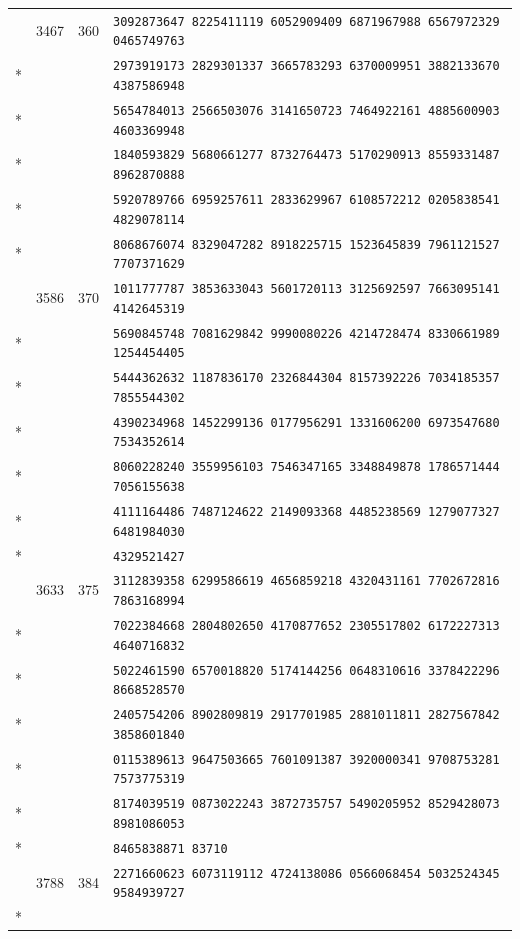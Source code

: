 \documentclass[10pt]{article}
\begin{document}
\begin{longtable}{@{}r@{\quad}r@{\quad}r@{\quad}l@{}}
\addlinespace[2pt]
76 & 3467 & 360 & \texttt{3092873647 8225411119 6052909409 6871967988 6567972329 0465749763}\\*
 & &  & \texttt{2973919173 2829301337 3665783293 6370009951 3882133670 4387586948}\\*
 & &  & \texttt{5654784013 2566503076 3141650723 7464922161 4885600903 4603369948}\\*
 & &  & \texttt{1840593829 5680661277 8732764473 5170290913 8559331487 8962870888}\\*
 & &  & \texttt{5920789766 6959257611 2833629967 6108572212 0205838541 4829078114}\\*
 & &  & \texttt{8068676074 8329047282 8918225715 1523645839 7961121527 7707371629}\\
\addlinespace[2pt]
77 & 3586 & 370 & \texttt{1011777787 3853633043 5601720113 3125692597 7663095141 4142645319}\\*
 & &  & \texttt{5690845748 7081629842 9990080226 4214728474 8330661989 1254454405}\\*
 & &  & \texttt{5444362632 1187836170 2326844304 8157392226 7034185357 7855544302}\\*
 & &  & \texttt{4390234968 1452299136 0177956291 1331606200 6973547680 7534352614}\\*
 & &  & \texttt{8060228240 3559956103 7546347165 3348849878 1786571444 7056155638}\\*
 & &  & \texttt{4111164486 7487124622 2149093368 4485238569 1279077327 6481984030}\\*
 & &  & \texttt{4329521427}\\
\addlinespace[2pt]
78 & 3633 & 375 & \texttt{3112839358 6299586619 4656859218 4320431161 7702672816 7863168994}\\*
 & &  & \texttt{7022384668 2804802650 4170877652 2305517802 6172227313 4640716832}\\*
 & &  & \texttt{5022461590 6570018820 5174144256 0648310616 3378422296 8668528570}\\*
 & &  & \texttt{2405754206 8902809819 2917701985 2881011811 2827567842 3858601840}\\*
 & &  & \texttt{0115389613 9647503665 7601091387 3920000341 9708753281 7573775319}\\*
 & &  & \texttt{8174039519 0873022243 3872735757 5490205952 8529428073 8981086053}\\*
 & &  & \texttt{8465838871 83710}\\
\addlinespace[2pt]
79 & 3788 & 384 & \texttt{2271660623 6073119112 4724138086 0566068454 5032524345 9584939727}\\*

\end{longtable}
\end{document}
